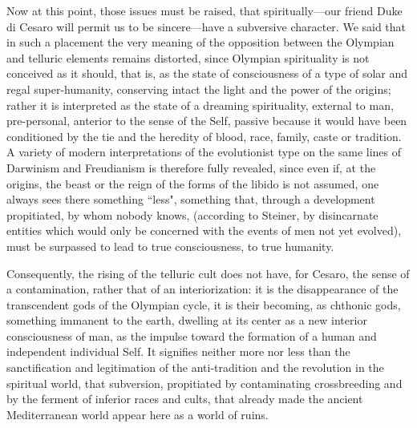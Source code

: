 Now at this point, those issues must be raised, that spiritually—our friend Duke di Cesaro will permit us to be sincere—have a subversive character. We said that in such a placement the very meaning of the opposition between the Olympian and telluric elements remains distorted, since Olympian spirituality is not conceived as it should, that is, as the state of consciousness of a type of solar and regal super-humanity, conserving intact the light and the power of the origins; rather it is interpreted as the state of a dreaming spirituality, external to man, pre-personal, anterior to the sense of the Self, passive because it would have been conditioned by the tie and the heredity of blood, race, family, caste or tradition. A variety of modern interpretations of the evolutionist type on the same lines of Darwinism and Freudianism is therefore fully revealed, since even if, at the origins, the beast or the reign of the forms of the libido is not assumed, one always sees there something ``less", something that, through a development propitiated, by whom nobody knows, (according to Steiner, by disincarnate entities which would only be concerned with the events of men not yet evolved), must be surpassed to lead to true consciousness, to true humanity.

Consequently, the rising of the telluric cult does not have, for Cesaro, the sense of a contamination, rather that of an interiorization: it is the disappearance of the transcendent gods of the Olympian cycle, it is their becoming, as chthonic gods, something immanent to the earth, dwelling at its center as a new interior consciousness of man, as the impulse toward the formation of a human and independent individual Self. It signifies neither more nor less than the sanctification and legitimation of the anti-tradition and the revolution in the spiritual world, that subversion, propitiated by contaminating crossbreeding and by the ferment of inferior races and cults, that already made the ancient Mediterranean world appear here as a world of ruins.

